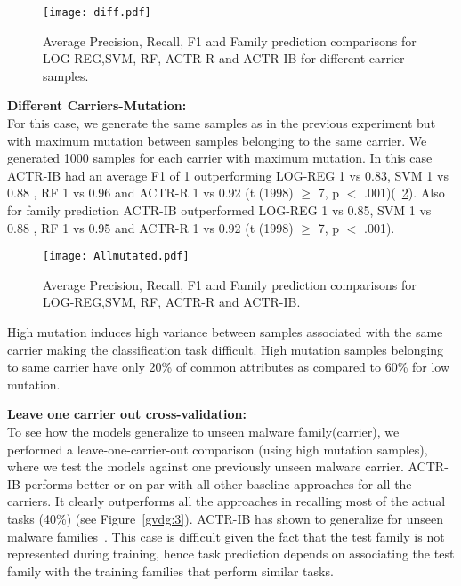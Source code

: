 \documentclass[conference]{IEEEtran}
\begin{document}
\begin{figure}[htb!]
	\centerline{\texttt{[image: diff.pdf]}}
	\vspace{0em}
	\caption{\textmd{Average Precision, Recall, F1 and Family prediction comparisons for LOG-REG,SVM, RF, ACTR-R and ACTR-IB for different carrier samples.}}
	\vspace{-1em}
	\label{gvdg:1}
\end{figure}


\noindent
{\bf Different Carriers-Mutation:}\\
For this case, we generate the same samples as in the previous experiment but with maximum mutation between samples belonging to the same carrier. We generated 1000 samples for each carrier with maximum mutation. In this case ACTR-IB had an average F1 of 1 outperforming LOG-REG 1 vs 0.83, SVM 1 vs 0.88  , RF 1 vs 0.96 and ACTR-R 1 vs 0.92 (t (1998) $\geq$ 7, p $<$ .001)(\figurename~\ref{gvdg:2}). Also for family prediction ACTR-IB outperformed LOG-REG 1 vs 0.85, SVM 1 vs 0.88  , RF 1 vs 0.95 and ACTR-R 1 vs 0.92 (t (1998) $\geq$ 7, p $<$ .001). 

\begin{figure}[htb!]
	\centerline{\texttt{[image: Allmutated.pdf]}}
	\vspace{0em}
	\caption{\textmd{Average Precision, Recall, F1 and Family prediction comparisons for LOG-REG,SVM, RF, ACTR-R and ACTR-IB.}}
	\vspace{-2em}
	\label{gvdg:2}
\end{figure}

High mutation induces high variance between samples associated with the same carrier making the classification task difficult. High mutation samples belonging to same carrier have only 20\% of common attributes as compared to 60\% for low mutation.

\noindent
{\bf Leave one carrier out cross-validation:}\\
To see how the models generalize to unseen malware family(carrier), we performed a leave-one-carrier-out comparison (using high mutation samples), where we test the models against one previously unseen malware carrier.  ACTR-IB performs better or on par with all other baseline approaches for all the carriers.  It clearly outperforms all the approaches in recalling most of the actual tasks (40\%) (see Figure~\ref{gvdg:3}). ACTR-IB has shown to generalize for unseen malware families~\cite{iccm:2015}. This case is difficult given the fact that the test family is not represented during training, hence task prediction depends on associating the test family with the training families that perform similar tasks. 
\end{document}
